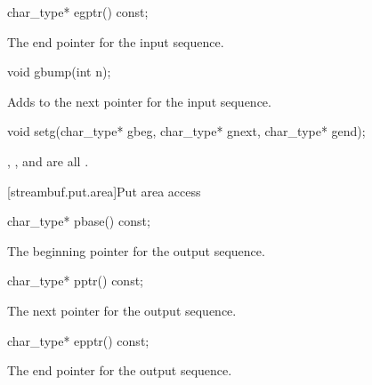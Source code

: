 %
\begin{itemdecl}
char_type* egptr() const;
\end{itemdecl}

\begin{itemdescr}
\pnum
\returns
The end pointer for the input sequence.
\end{itemdescr}

%
\begin{itemdecl}
void gbump(int n);
\end{itemdecl}

\begin{itemdescr}
\pnum
\effects
Adds  to the next pointer for the input sequence.
\end{itemdescr}

%
\begin{itemdecl}
void setg(char_type* gbeg, char_type* gnext, char_type* gend);
\end{itemdecl}

\begin{itemdescr}
\pnum
\ensures
{},
,
and
 are all .
\end{itemdescr}

[streambuf.put.area]{Put area access}

%
\begin{itemdecl}
char_type* pbase() const;
\end{itemdecl}

\begin{itemdescr}
\pnum
\returns
The beginning pointer for the output sequence.
\end{itemdescr}

%
\begin{itemdecl}
char_type* pptr() const;
\end{itemdecl}

\begin{itemdescr}
\pnum
\returns
The next pointer for the output sequence.
\end{itemdescr}

%
\begin{itemdecl}
char_type* epptr() const;
\end{itemdecl}

\begin{itemdescr}
\pnum
\returns
The end pointer for the output sequence.
\end{itemdescr}

